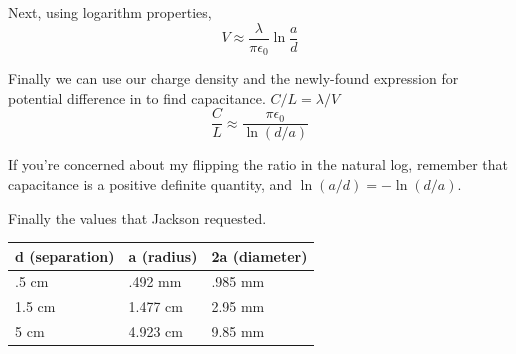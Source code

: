 \documentclass[10pt,a4paper]{article}
\begin{document}
Next, using logarithm properties, 
\begin{equation}
V \approx \frac{\lambda}{\pi\epsilon_0}\ln \frac{a}{d}
\end{equation}

Finally we can use our charge density and the newly-found expression for potential difference in to find capacitance. $C/L=\lambda/V$
\begin{equation}
\frac{C}{L}\approx \frac{\pi\epsilon_0}{\ln(d/a)}
\end{equation}

If you're concerned about my flipping the ratio in the natural log, remember that capacitance is a positive definite quantity, and $\ln(a/d)=-\ln(d/a)$.

Finally the values that Jackson requested.
\begin{table}[h]\centering
    \begin{tabular}{|l|l|l|}
        \hline
        d (separation) & a (radius) & 2a (diameter) \\ \hline
        .5 cm          & .492 mm    & .985 mm       \\ 
        1.5 cm         & 1.477 cm   & 2.95 mm       \\ 
        5 cm           & 4.923 cm   & 9.85 mm       \\
        \hline
    \end{tabular}
\end{table}
\end{document}
